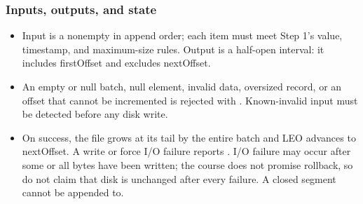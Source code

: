 \subsubsection*{Inputs, outputs, and state}
\begin{itemize}
\item Input is a nonempty  in append order; each item must meet Step 1's value, timestamp, and maximum-size rules. Output  is a half-open interval: it includes firstOffset and excludes nextOffset.
\item An empty or null batch, null element, invalid data, oversized record, or an offset that cannot be incremented is rejected with . Known-invalid input must be detected before any disk write.
\item On success, the file grows at its tail by the entire batch and LEO advances to nextOffset. A write or force I/O failure reports . I/O failure may occur after some or all bytes have been written; the course does not promise rollback, so do not claim that disk is unchanged after every failure. A closed segment cannot be appended to.
\end{itemize}
